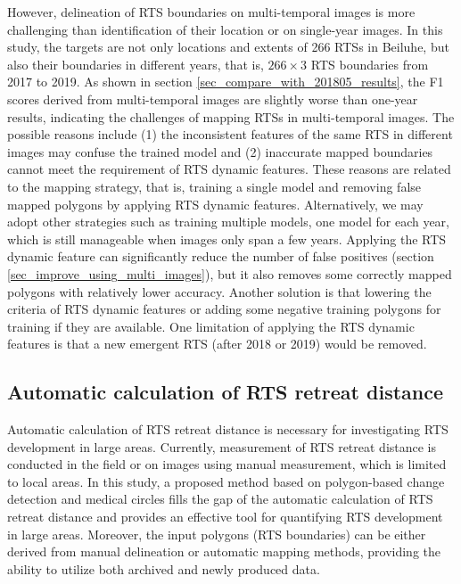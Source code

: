\documentclass[authoryear,preprint,review,12pt]{elsarticle}
\begin{document}
However, delineation of RTS boundaries on multi-temporal images is more challenging than identification of their location or on single-year images. 
In this study, the targets are not only locations and extents of 266 RTSs in Beiluhe, but also their boundaries in different years, that is, $266\times3$ RTS boundaries from 2017 to 2019.
As shown in section \ref{sec_compare_with_201805_results}, the F1 scores derived from multi-temporal images are slightly worse than one-year results, indicating the challenges of mapping RTSs in multi-temporal images. 
The possible reasons include (1) the inconsistent features of the same RTS in different images may confuse the trained model 
and (2) inaccurate mapped boundaries cannot meet the requirement of RTS dynamic features. 
These reasons are related to the mapping strategy, that is, training a single model and removing false mapped polygons by applying RTS dynamic features.  
Alternatively, we may adopt other strategies such as training multiple models, one model for each year,  which is still manageable when images only span a few years.
Applying the RTS dynamic feature can significantly reduce the number of false positives (section \ref{sec_improve_using_multi_images}), but it also removes some correctly mapped polygons with relatively lower accuracy. 
Another solution is that lowering the criteria of RTS dynamic features or adding some negative training polygons for training if they are available.
One limitation of applying the RTS dynamic features is that a new emergent RTS (after 2018 or 2019) would be removed. 



\subsection{Automatic calculation of RTS retreat distance}
\label{sec_diss_retreat_distance}

Automatic calculation of RTS retreat distance is necessary for investigating RTS development in large areas.
Currently, measurement of RTS retreat distance is conducted in the field or on images using manual measurement, which is limited to local areas. 
In this study, a proposed method based on polygon-based change detection and medical circles fills the gap of the automatic calculation of RTS retreat distance 
and provides an effective tool for quantifying RTS development in large areas. 
Moreover, the input polygons (RTS boundaries) can be either derived from manual delineation or automatic mapping methods, 
providing the ability to utilize both archived and newly produced data.
\end{document}

